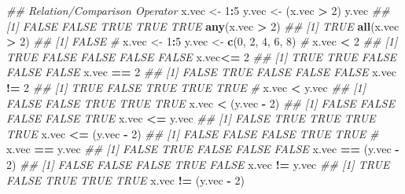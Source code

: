\documentclass[
]{book}
\newenvironment{Shaded}{\begin{snugshade}}{\end{snugshade}}
\newcommand{\CommentTok}[1]{\textcolor[rgb]{0.56,0.35,0.01}{\textit{#1}}}
\newcommand{\DecValTok}[1]{\textcolor[rgb]{0.00,0.00,0.81}{#1}}
\newcommand{\KeywordTok}[1]{\textcolor[rgb]{0.13,0.29,0.53}{\textbf{#1}}}
\newcommand{\NormalTok}[1]{#1}
\newcommand{\OperatorTok}[1]{\textcolor[rgb]{0.81,0.36,0.00}{\textbf{#1}}}
\newcommand{\StringTok}[1]{\textcolor[rgb]{0.31,0.60,0.02}{#1}}
\begin{document}
\begin{Shaded}
\begin{Highlighting}[]
\CommentTok{\#\# Relation/Comparison Operator}
\NormalTok{x.vec \textless{}{-}}\StringTok{ }\DecValTok{1}\OperatorTok{:}\DecValTok{5}
\NormalTok{y.vec \textless{}{-}}\StringTok{ }\NormalTok{(x.vec }\OperatorTok{\textgreater{}}\StringTok{ }\DecValTok{2}\NormalTok{)}
\NormalTok{y.vec}
\CommentTok{\#\# [1] FALSE FALSE  TRUE  TRUE  TRUE}
\KeywordTok{any}\NormalTok{(x.vec }\OperatorTok{\textgreater{}}\StringTok{ }\DecValTok{2}\NormalTok{)}
\CommentTok{\#\# [1] TRUE}
\KeywordTok{all}\NormalTok{(x.vec }\OperatorTok{\textgreater{}}\StringTok{ }\DecValTok{2}\NormalTok{)}
\CommentTok{\#\# [1] FALSE}
\CommentTok{\#}
\NormalTok{x.vec \textless{}{-}}\StringTok{ }\DecValTok{1}\OperatorTok{:}\DecValTok{5}
\NormalTok{y.vec \textless{}{-}}\StringTok{ }\KeywordTok{c}\NormalTok{(}\DecValTok{0}\NormalTok{, }\DecValTok{2}\NormalTok{, }\DecValTok{4}\NormalTok{, }\DecValTok{6}\NormalTok{, }\DecValTok{8}\NormalTok{)}
\CommentTok{\#}
\NormalTok{x.vec }\OperatorTok{\textless{}}\StringTok{ }\DecValTok{2}
\CommentTok{\#\# [1]  TRUE FALSE FALSE FALSE FALSE}
\NormalTok{x.vec}\OperatorTok{\textless{}=}\StringTok{ }\DecValTok{2}
\CommentTok{\#\# [1]  TRUE  TRUE FALSE FALSE FALSE}
\NormalTok{x.vec }\OperatorTok{==}\StringTok{ }\DecValTok{2}
\CommentTok{\#\# [1] FALSE  TRUE FALSE FALSE FALSE}
\NormalTok{x.vec }\OperatorTok{!=}\StringTok{ }\DecValTok{2}
\CommentTok{\#\# [1]  TRUE FALSE  TRUE  TRUE  TRUE}
\CommentTok{\#}
\NormalTok{x.vec }\OperatorTok{\textless{}}\StringTok{ }\NormalTok{y.vec}
\CommentTok{\#\# [1] FALSE FALSE  TRUE  TRUE  TRUE}
\NormalTok{x.vec }\OperatorTok{\textless{}}\StringTok{ }\NormalTok{(y.vec }\OperatorTok{{-}}\StringTok{ }\DecValTok{2}\NormalTok{)}
\CommentTok{\#\# [1] FALSE FALSE FALSE FALSE  TRUE}
\NormalTok{x.vec }\OperatorTok{\textless{}=}\StringTok{ }\NormalTok{y.vec}
\CommentTok{\#\# [1] FALSE  TRUE  TRUE  TRUE  TRUE}
\NormalTok{x.vec }\OperatorTok{\textless{}=}\StringTok{ }\NormalTok{(y.vec }\OperatorTok{{-}}\StringTok{ }\DecValTok{2}\NormalTok{)}
\CommentTok{\#\# [1] FALSE FALSE FALSE  TRUE  TRUE}
\CommentTok{\#}
\NormalTok{x.vec }\OperatorTok{==}\StringTok{ }\NormalTok{y.vec}
\CommentTok{\#\# [1] FALSE  TRUE FALSE FALSE FALSE}
\NormalTok{x.vec }\OperatorTok{==}\StringTok{ }\NormalTok{(y.vec }\OperatorTok{{-}}\StringTok{ }\DecValTok{2}\NormalTok{)}
\CommentTok{\#\# [1] FALSE FALSE FALSE  TRUE FALSE}
\NormalTok{x.vec }\OperatorTok{!=}\StringTok{ }\NormalTok{y.vec}
\CommentTok{\#\# [1]  TRUE FALSE  TRUE  TRUE  TRUE}
\NormalTok{x.vec }\OperatorTok{!=}\StringTok{ }\NormalTok{(y.vec }\OperatorTok{{-}}\StringTok{ }\DecValTok{2}\NormalTok{)}

\end{Highlighting}
\end{Shaded}
\end{document}
